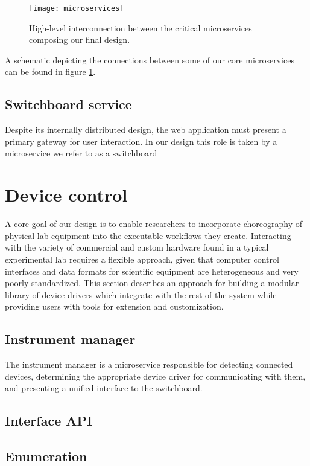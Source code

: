 \documentclass[../thesis]{subfiles}
\begin{document}
\begin{figure}
  \texttt{[image: microservices]}
  \caption{
    High-level interconnection between the critical microservices
    composing our final design.
    \label{fig:Microservices}
  }
\end{figure}

A schematic depicting the connections between some of our core
microservices can be found in figure \ref{fig:Microservices}.

\subsection{Switchboard service}
Despite its internally distributed design, the web application must
present a primary gateway for user interaction. In our design this
role is taken by a microservice we refer to as a \gls{switchboard}

\section{Device control}
A core goal of our design is to enable researchers to incorporate
choreography of physical lab equipment into the executable workflows
they create. Interacting with the variety of commercial and custom
hardware found in a typical experimental lab requires a flexible
approach, given that computer control interfaces and data formats for
scientific equipment are heterogeneous and very poorly
standardized. This section describes an approach for building a
modular library of device drivers which integrate with the rest of the
system while providing users with tools for extension and
customization.

\subsection{Instrument manager}
The instrument manager is a microservice responsible for detecting
connected devices, determining the appropriate device driver for
communicating with them, and presenting a unified interface to the
switchboard.

\subsection{Interface API}

\subsection{Enumeration}
\end{document}
